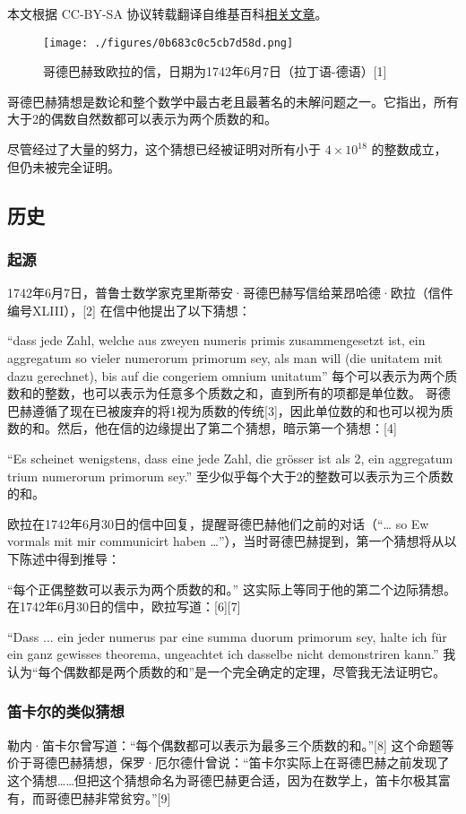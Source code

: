 
本文根据 CC-BY-SA 协议转载翻译自维基百科\href{https://en.wikipedia.org/wiki/Goldbach\%27s_conjecture}{相关文章}。

\begin{figure}[ht]
\centering
\texttt{[image: ./figures/0b683c0c5cb7d58d.png]}
\caption{哥德巴赫致欧拉的信，日期为1742年6月7日（拉丁语-德语）[1]} \label{fig_GDBHCX_1}
\end{figure}
哥德巴赫猜想是数论和整个数学中最古老且最著名的未解问题之一。它指出，所有大于2的偶数自然数都可以表示为两个质数的和。

尽管经过了大量的努力，这个猜想已经被证明对所有小于 \(4 \times 10^{18}\) 的整数成立，但仍未被完全证明。
\subsection{历史}  
\subsubsection{起源}  
1742年6月7日，普鲁士数学家克里斯蒂安·哥德巴赫写信给莱昂哈德·欧拉（信件编号XLIII），[2] 在信中他提出了以下猜想：

“dass jede Zahl, welche aus zweyen numeris primis zusammengesetzt ist, ein aggregatum so vieler numerorum primorum sey, als man will (die unitatem mit dazu gerechnet), bis auf die congeriem omnium unitatum”  
每个可以表示为两个质数和的整数，也可以表示为任意多个质数之和，直到所有的项都是单位数。  
哥德巴赫遵循了现在已被废弃的将1视为质数的传统[3]，因此单位数的和也可以视为质数的和。然后，他在信的边缘提出了第二个猜想，暗示第一个猜想：[4]  

“Es scheinet wenigstens, dass eine jede Zahl, die grösser ist als 2, ein aggregatum trium numerorum primorum sey.”  
至少似乎每个大于2的整数可以表示为三个质数的和。

欧拉在1742年6月30日的信中回复，提醒哥德巴赫他们之前的对话（“… so Ew vormals mit mir communicirt haben …”），当时哥德巴赫提到，第一个猜想将从以下陈述中得到推导：

“每个正偶整数可以表示为两个质数的和。”  
这实际上等同于他的第二个边际猜想。在1742年6月30日的信中，欧拉写道：[6][7]  

“Dass ... ein jeder numerus par eine summa duorum primorum sey, halte ich für ein ganz gewisses theorema, ungeachtet ich dasselbe nicht demonstriren kann.”  
我认为“每个偶数都是两个质数的和”是一个完全确定的定理，尽管我无法证明它。
\subsubsection{笛卡尔的类似猜想}  
勒内·笛卡尔曾写道：“每个偶数都可以表示为最多三个质数的和。”[8] 这个命题等价于哥德巴赫猜想，保罗·厄尔德什曾说：“笛卡尔实际上在哥德巴赫之前发现了这个猜想……但把这个猜想命名为哥德巴赫更合适，因为在数学上，笛卡尔极其富有，而哥德巴赫非常贫穷。”[9]

